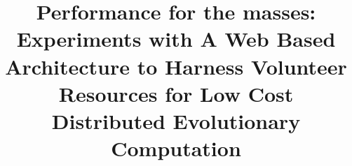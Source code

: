 \documentclass{sig-alternate}
\begin{document}


\title{Performance for the masses: Experiments with A Web Based Architecture to Harness Volunteer Resources 
for Low Cost Distributed Evolutionary Computation }
%
%
%
%
%

%
\end{document}
